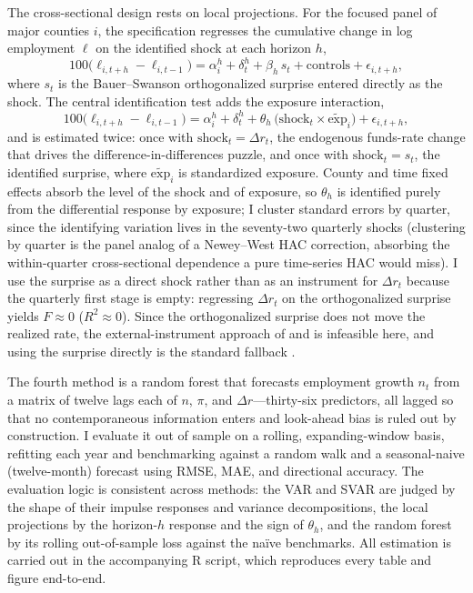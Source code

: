 \documentclass[11pt]{article}
\begin{document}
The cross-sectional design rests on local projections. For the focused panel of major counties
$i$, the \citet{jorda2005} specification regresses the cumulative change in log employment $\ell$
on the identified shock at each horizon $h$,
\begin{equation}
100\big(\ell_{i,t+h}-\ell_{i,t-1}\big)=\alpha_i^{h}+\delta_t^{h}+\beta_h\, s_t + \text{controls} + \epsilon_{i,t+h},
\end{equation}
where $s_t$ is the Bauer--Swanson orthogonalized surprise entered directly as the shock. The
central identification test adds the exposure interaction,
\begin{equation}
100\big(\ell_{i,t+h}-\ell_{i,t-1}\big)=\alpha_i^{h}+\delta_t^{h}+\theta_h\,\big(\text{shock}_t\times \widetilde{\text{exp}}_i\big)+\epsilon_{i,t+h},
\label{eq:lpint}
\end{equation}
and is estimated twice: once with $\text{shock}_t=\Delta r_t$, the endogenous funds-rate change
that drives the difference-in-differences puzzle, and once with $\text{shock}_t=s_t$, the
identified surprise, where $\widetilde{\text{exp}}_i$ is standardized exposure. County and time
fixed effects absorb the level of the shock and of exposure, so $\theta_h$ is identified purely
from the differential response by exposure; I cluster standard errors by quarter, since the
identifying variation lives in the seventy-two quarterly shocks (clustering by quarter is the
panel analog of a Newey--West HAC correction, absorbing the within-quarter cross-sectional
dependence a pure time-series HAC would miss). I use the surprise as a direct
shock rather than as an instrument for $\Delta r_t$ because the quarterly first stage is empty:
regressing $\Delta r_t$ on the orthogonalized surprise yields $F\approx0$ ($R^2\approx0$). Since the orthogonalized surprise does not move the
realized rate, the external-instrument approach of \citet{gertlerkaradi2015} and
\citet{stockwatson2018} is infeasible here, and using the surprise directly is the standard
fallback \citep{coibion2012}.

The fourth method is a random forest that forecasts employment growth $n_t$ from a matrix of
twelve lags each of $n$, $\pi$, and $\Delta r$---thirty-six predictors, all lagged so that no
contemporaneous information enters and look-ahead bias is ruled out by construction. I evaluate it
out of sample on a rolling, expanding-window basis, refitting each year and benchmarking against a
random walk and a seasonal-naive (twelve-month) forecast using RMSE, MAE, and directional accuracy. The evaluation logic is consistent across methods: the VAR and SVAR
are judged by the shape of their impulse responses and variance decompositions, the local
projections by the horizon-$h$ response and the sign of $\theta_h$, and the random forest by its
rolling out-of-sample loss against the na\"ive benchmarks. All estimation is carried out in the
accompanying R script, which reproduces every table and figure end-to-end.
\end{document}
